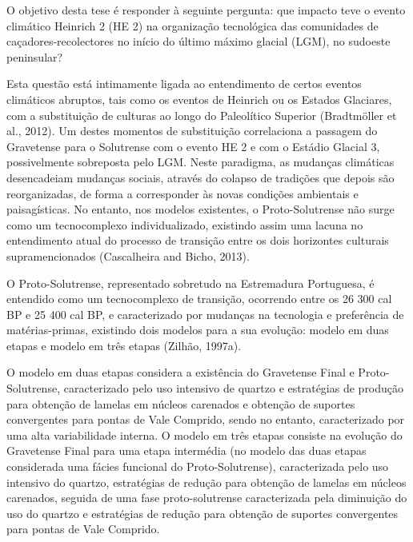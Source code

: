 \documentclass[12pt,twoside]{reedthesis}
\begin{document}
  \begin{resumo}
    O objetivo desta tese é responder à seguinte pergunta: que impacto teve o evento climático Heinrich 2 (HE 2) na organização tecnológica das comunidades de caçadores-recolectores no início do último máximo glacial (LGM), no sudoeste peninsular?
    
    \par
    
    Esta questão está intimamente ligada ao entendimento de certos eventos climáticos abruptos, tais como os eventos de Heinrich ou os Estados Glaciares, com a substituição de culturas ao longo do Paleolítico Superior (Bradtmöller et al., 2012). Um destes momentos de substituição correlaciona a passagem do Gravetense para o Solutrense com o evento HE 2 e com o Estádio Glacial 3, possivelmente sobreposta pelo LGM. Neste paradigma, as mudanças climáticas desencadeiam mudanças sociais, através do colapso de tradições que depois são reorganizadas, de forma a corresponder às novas condições ambientais e paisagísticas. No entanto, nos modelos existentes, o Proto-Solutrense não surge como um tecnocomplexo individualizado, existindo assim uma lacuna no entendimento atual do processo de transição entre os dois horizontes culturais supramencionados (Cascalheira and Bicho, 2013).
    
    O Proto-Solutrense, representado sobretudo na Estremadura Portuguesa, é entendido como um tecnocomplexo de transição, ocorrendo entre os 26 300 cal BP e 25 400 cal BP, e caracterizado por mudanças na tecnologia e preferência de matérias-primas, existindo dois modelos para a sua evolução: modelo em duas etapas e modelo em três etapas (Zilhão, 1997a).
    
    O modelo em duas etapas considera a existência do Gravetense Final e Proto-Solutrense, caracterizado pelo uso intensivo de quartzo e estratégias de produção para obtenção de lamelas em núcleos carenados e obtenção de suportes convergentes para pontas de Vale Comprido, sendo no entanto, caracterizado por uma alta variabilidade interna. O modelo em três etapas consiste na evolução do Gravetense Final para uma etapa intermédia (no modelo das duas etapas considerada uma fácies funcional do Proto-Solutrense), caracterizada pelo uso intensivo do quartzo, estratégias de redução para obtenção de lamelas em núcleos carenados, seguida de uma fase proto-solutrense caracterizada pela diminuição do uso do quartzo e estratégias de redução para obtenção de suportes convergentes para pontas de Vale Comprido.
    

\end{resumo}
\end{document}
